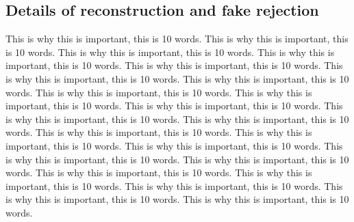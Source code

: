 \begin{textbox}[!h]
\section{Details of \MET reconstruction and fake \MET rejection}
This is why this is important, this is 10 words. 
This is why this is important, this is 10 words. 
This is why this is important, this is 10 words. 
This is why this is important, this is 10 words. 
This is why this is important, this is 10 words. 
This is why this is important, this is 10 words. 
This is why this is important, this is 10 words. 
This is why this is important, this is 10 words. 
This is why this is important, this is 10 words. 
This is why this is important, this is 10 words. 
This is why this is important, this is 10 words. 
This is why this is important, this is 10 words. 
This is why this is important, this is 10 words. 
This is why this is important, this is 10 words. 
This is why this is important, this is 10 words. 
This is why this is important, this is 10 words. 
This is why this is important, this is 10 words. 
This is why this is important, this is 10 words. 
This is why this is important, this is 10 words. 
This is why this is important, this is 10 words. 
This is why this is important, this is 10 words. 
This is why this is important, this is 10 words. 




\end{textbox}
